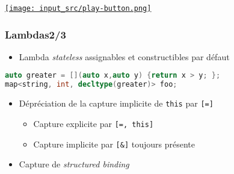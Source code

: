 \documentclass[C++.tex]{subfiles}
\begin{document}
\begin{frame}[fragile]
	\hfill
	\href{https://godbolt.org/#g:!((g:!((g:!((h:codeEditor,i:(filename:'1',fontScale:14,fontUsePx:'0',j:1,lang:c%2B%2B,selection:(endColumn:6,endLineNumber:17,positionColumn:6,positionLineNumber:17,selectionStartColumn:6,selectionStartLineNumber:17,startColumn:6,startLineNumber:17),source:'%23include+%3Ciostream%3E%0A%23include+%3Cvector%3E%0A%0Aint+main()%0A%7B%0A++auto+foo+%3D+%5B%5D%3Ctypename+T%3E(T+first,+T+second)+%7B+return+first+%2B+second%3B+%7D%3B%0A%0A++std::cout+%3C%3C+foo(1,+5)+%3C%3C+%22%5Cn%22%3B%0A%23if+0%0A++std::cout+%3C%3C+foo(1.,+5)+%3C%3C+%22%5Cn%22%3B%0A%23endif%0A%0A++auto+bar+%3D+%5B%5D%3Ctypename+T%3E(std::vector%3CT%3E+vec)+%7B+return+std::size(vec)%3B+%7D%3B%0A%0A++std::cout+%3C%3C+bar(std::vector%3Cint%3E%7B1,+2,+3%7D)+%3C%3C+%22%5Cn%22%3B%0A++std::cout+%3C%3C+bar(std::vector%3Cdouble%3E%7B1.,+2.%7D)+%3C%3C+%22%5Cn%22%3B%0A%23if+0%0A++std::cout+%3C%3C+bar(5)+%3C%3C+%22%5Cn%22%3B%0A%23endif%0A%7D%0A'),l:'5',n:'0',o:'C%2B%2B+source+%231',t:'0')),k:50,l:'4',n:'0',o:'',s:0,t:'0'),(g:!((h:executor,i:(argsPanelShown:'1',compilationPanelShown:'0',compiler:g112,compilerOutShown:'0',execArgs:'',execStdin:'',fontScale:14,fontUsePx:'0',j:1,lang:c%2B%2B,libs:!((name:boost,ver:'175')),options:'-std%3Dc%2B%2B20',source:1,stdinPanelShown:'1',tree:'1',wrap:'0'),l:'5',n:'0',o:'Executor+x86-64+gcc+11.2+(C%2B%2B,+Editor+%231)',t:'0')),header:(),k:50,l:'4',n:'0',o:'',s:0,t:'0')),l:'2',n:'0',o:'',t:'0')),version:4}{\texttt{[image: input\_src/play-button.png]}}
\end{frame}

\begin{frame}[fragile]
	\frametitle{Lambdas\titlehfill{}2/3}
	\begin{itemize}
		\item Lambda \textit{stateless} assignables et constructibles par défaut

	\end{itemize}

	\begin{lstlisting}[language=C++]
auto greater = [](auto x,auto y) {return x > y; };
map<string, int, decltype(greater)> foo;\end{lstlisting}

	\begin{itemize}
		\item Dépréciation de la capture implicite de \lstinline|this| par \lstinline|[=]|
		\begin{itemize}
			\item Capture explicite par \lstinline|[=, this]|


			\item Capture implicite par \lstinline|[&]| toujours présente
		\end{itemize}
		\item Capture de \textit{structured binding}
	\end{itemize}
\end{frame}
\end{document}
